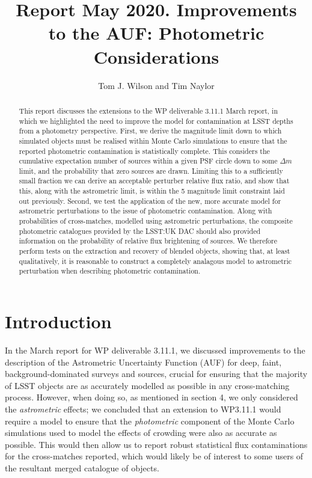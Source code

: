 \documentclass[fleqn,usenatbib]{mnras}
\title[]{Report May 2020. Improvements to the AUF: Photometric Considerations}
\author[Tom J. Wilson and Tim Naylor]{
Tom J. Wilson
and Tim Naylor
\\
}
\date{}
\begin{document}
\label{firstpage}
\pagerange{\pageref{firstpage}--\pageref{lastpage}}
\maketitle
\begin{abstract}
This report discusses the extensions to the WP deliverable 3.11.1 March report, in which we highlighted the need to improve the model for contamination at LSST depths from a photometry perspective.
First, we derive the magnitude limit down to which simulated objects must be realised within Monte Carlo simulations to ensure that the reported photometric contamination is statistically complete.
This considers the cumulative expectation number of sources within a given PSF circle down to some $\Delta m$ limit, and the probability that zero sources are drawn.
Limiting this to a sufficiently small fraction we can derive an acceptable perturber relative flux ratio, and show that this, along with the astrometric limit, is within the 5 magnitude limit constraint laid out previously.
Second, we test the application of the new, more accurate model for astrometric perturbations to the issue of photometric contamination.
Along with probabilities of cross-matches, modelled using astrometric perturbations, the composite photometric catalogues provided by the LSST:UK DAC should also provided information on the probability of relative flux brightening of sources.
We therefore perform tests on the extraction and recovery of blended objects, showing that, at least qualitatively, it is reasonable to construct a completely analagous model to astrometric perturbation when describing photometric contamination.

\end{abstract}

\section{Introduction}
In the March report for WP deliverable 3.11.1, we discussed improvements to the description of the Astrometric Uncertainty Function (AUF) for deep, faint, background-dominated surveys and sources, crucial for ensuring that the majority of LSST objects are as accurately modelled as possible in any cross-matching process.
However, when doing so, as mentioned in section 4, we only considered the \textit{astrometric} effects; we concluded that an extension to WP3.11.1 would require a model to ensure that the \textit{photometric} component of the Monte Carlo simulations used to model the effects of crowding were also as accurate as possible.
This would then allow us to report robust statistical flux contaminations for the cross-matches reported, which would likely be of interest to some users of the resultant merged catalogue of objects.
\end{document}
